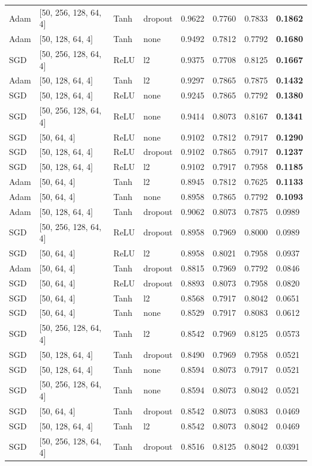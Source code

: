 \documentclass[12pt,a4paper]{article}
\begin{document}
\begin{table}[h]
\begin{tabular}{llllllll}
Adam & [50, 256, 128, 64, 4] & Tanh & dropout & 0.9622 & 0.7760 & 0.7833 & \textbf{0.1862} \\
Adam & [50, 128, 64, 4] & Tanh & none & 0.9492 & 0.7812 & 0.7792 & \textbf{0.1680} \\
SGD & [50, 256, 128, 64, 4] & ReLU & l2 & 0.9375 & 0.7708 & 0.8125 & \textbf{0.1667} \\
Adam & [50, 128, 64, 4] & Tanh & l2 & 0.9297 & 0.7865 & 0.7875 & \textbf{0.1432} \\
SGD & [50, 128, 64, 4] & ReLU & none & 0.9245 & 0.7865 & 0.7792 & \textbf{0.1380} \\
SGD & [50, 256, 128, 64, 4] & ReLU & none & 0.9414 & 0.8073 & 0.8167 & \textbf{0.1341} \\
SGD & [50, 64, 4] & ReLU & none & 0.9102 & 0.7812 & 0.7917 & \textbf{0.1290} \\
SGD & [50, 128, 64, 4] & ReLU & dropout & 0.9102 & 0.7865 & 0.7917 & \textbf{0.1237} \\
SGD & [50, 128, 64, 4] & ReLU & l2 & 0.9102 & 0.7917 & 0.7958 & \textbf{0.1185} \\
Adam & [50, 64, 4] & Tanh & l2 & 0.8945 & 0.7812 & 0.7625 & \textbf{0.1133} \\
Adam & [50, 64, 4] & Tanh & none & 0.8958 & 0.7865 & 0.7792 & \textbf{0.1093} \\
Adam & [50, 128, 64, 4] & Tanh & dropout & 0.9062 & 0.8073 & 0.7875 & 0.0989 \\
SGD & [50, 256, 128, 64, 4] & ReLU & dropout & 0.8958 & 0.7969 & 0.8000 & 0.0989 \\
SGD & [50, 64, 4] & ReLU & l2 & 0.8958 & 0.8021 & 0.7958 & 0.0937 \\
Adam & [50, 64, 4] & Tanh & dropout & 0.8815 & 0.7969 & 0.7792 & 0.0846 \\
SGD & [50, 64, 4] & ReLU & dropout & 0.8893 & 0.8073 & 0.7958 & 0.0820 \\
SGD & [50, 64, 4] & Tanh & l2 & 0.8568 & 0.7917 & 0.8042 & 0.0651 \\
SGD & [50, 64, 4] & Tanh & none & 0.8529 & 0.7917 & 0.8083 & 0.0612 \\
SGD & [50, 256, 128, 64, 4] & Tanh & l2 & 0.8542 & 0.7969 & 0.8125 & 0.0573 \\
SGD & [50, 128, 64, 4] & Tanh & dropout & 0.8490 & 0.7969 & 0.7958 & 0.0521 \\
SGD & [50, 128, 64, 4] & Tanh & none & 0.8594 & 0.8073 & 0.7917 & 0.0521 \\
SGD & [50, 256, 128, 64, 4] & Tanh & none & 0.8594 & 0.8073 & 0.8042 & 0.0521 \\
SGD & [50, 64, 4] & Tanh & dropout & 0.8542 & 0.8073 & 0.8083 & 0.0469 \\
SGD & [50, 128, 64, 4] & Tanh & l2 & 0.8542 & 0.8073 & 0.8042 & 0.0469 \\
SGD & [50, 256, 128, 64, 4] & Tanh & dropout & 0.8516 & 0.8125 & 0.8042 & 0.0391 \\
\bottomrule
\end{tabular}
\end{table}
\end{document}
